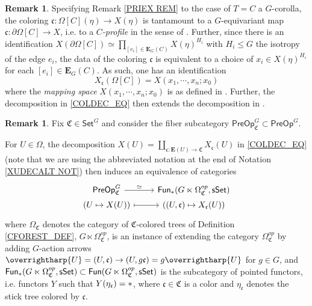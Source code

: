 \documentclass[a4paper,10pt
,draft
]{article}%
\numberwithin{equation}{section}
\numberwithin{figure}{section}
\theoremstyle{definition} %
\newtheorem{remark}[equation]{Remark}%
\newcommand{\vect}[1]{\text{\overrightharp{\ensuremath{#1}}}}
\newcommand{\1}{\ensuremath{\mathbbm 1}}%
\begin{document}
\begin{remark}\label{MAPSPTRANS REM}
	Specifying Remark \ref{PRIEX REM} to the case 
	of $T=C$ a $G$-corolla, the coloring
	$\mathfrak{c} \colon 
	\Omega[C](\eta) \to X(\eta)$
	is tantamount to a $G$-equivariant map
	$\mathfrak{c} \colon \partial \Omega[C] \to X$,
	i.e. to a \emph{$C$-profile} in the sense of 
	\cite[Def. 5.6]{BP_edss}.
	Further, since there is an identification
	$X(\partial \Omega[C])
	\simeq
	\prod_{[e_i] \in \boldsymbol{E}_G(C)} X(\eta)^{H_i}$
	with $H_i \leq G$ the isotropy of the edge $e_i$,
	the data of the coloring $\mathfrak{c}$
	is equivalent to a choice of $x_i \in X(\eta)^{H_i}$
	for each $[e_i] \in \boldsymbol{E}_G(C)$.
%	
	As such, one has an identification
\begin{equation}\label{MAPSPTRANS EQ}
	X_{\mathfrak{c}}(\Omega[C]) = X(x_1,\cdots,x_n;x_0)
\end{equation}
	where the \emph{mapping space}
	$X(x_1,\cdots,x_n;x_0)$
	is as defined in \cite[Def. 5.7]{BP_edss}.
	Further, 
	the decomposition in \eqref{COLDEC_EQ} %
	then extends the decomposition in 
	\cite[Rem. 5.14]{BP_edss}.
\end{remark}





\begin{remark}
	Fix $\mathfrak{C} \in \mathsf{Set}^G$
	and consider the fiber subcategory 
	$\mathsf{PreOp}^G_{\mathfrak{C}} \subset \mathsf{PreOp}^G$.
	
	For $U \in \Omega$, the decomposition
	$X(U) = \coprod_{\mathfrak{c} \colon \boldsymbol{E}(U) \to \mathfrak{C}} X_{\mathfrak{c}}(U)$
	in \eqref{COLDEC_EQ} %
	(note that we are using the abbreviated notation at the end of
	Notation \ref{XUDECALT NOT})
	then induces an equivalence of categories
\begin{equation}\label{PREOPCOLFIXEQ EQ}
\begin{tikzcd}[row sep = 0]
	\mathsf{PreOp}^G_{\mathfrak{C}}
	\ar{r}{\simeq}
&
	\mathsf{Fun}_{\**}(G \ltimes \Omega^{op}_{\mathfrak{C}},\mathsf{sSet})
\\
	(U \mapsto X(U))
	\ar[mapsto]{r}
&
	((U,\mathfrak{c}) \mapsto X_{\mathfrak{c}}(U))
\end{tikzcd}
\end{equation}
	where $\Omega_{\mathfrak{C}}$
	denotes the category of $\mathfrak{C}$-colored trees of 
	Definition \ref{CFOREST_DEF},
	$G \ltimes \Omega^{op}_{\mathfrak{C}}$,
	is an instance of
	\cite[Ex. \ref{OC-GLTIMES EQ}]{BP_FCOP}
	extending the category  
	$\Omega^{op}_{\mathfrak{C}}$
	by adding $G$-action arrows
	$\vect{U} = (U, \mathfrak{c})
	\to (U, g \mathfrak{c}) = g\vect{U}$
	for $g \in G$,
	and 
	$\mathsf{Fun}_{\**}(G \ltimes \Omega^{op}_{\mathfrak{C}},\mathsf{sSet})
	\subset
	\mathsf{Fun}(G \ltimes \Omega^{op}_{\mathfrak{C}},\mathsf{sSet})$
	is the subcategory of pointed functors,
	i.e. functors $Y$ such that
	$Y(\eta_{\mathfrak{c}}) = \**$,
	where $\mathfrak{c} \in \mathfrak{C}$ is a color
	and $\eta_{\mathfrak{c}}$ denotes the stick tree colored by $\mathfrak{c}$.
\end{remark}
\end{document}
